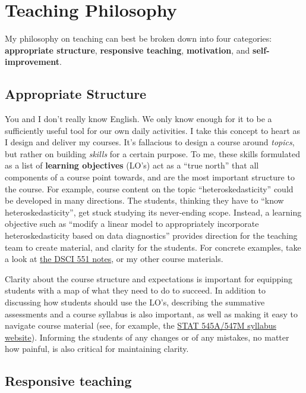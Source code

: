 \documentclass[]{book}
\begin{document}
\hypertarget{teaching-philosophy}{%
\section{Teaching Philosophy}\label{teaching-philosophy}}

My philosophy on teaching can best be broken down into four categories: \textbf{appropriate structure}, \textbf{responsive teaching}, \textbf{motivation}, and \textbf{self-improvement}.

\hypertarget{appropriate-structure}{%
\subsection{Appropriate Structure}\label{appropriate-structure}}

You and I don't really know English. We only know enough for it to be a sufficiently useful tool for our own daily activities. I take this concept to heart as I design and deliver my courses. It's fallacious to design a course around \emph{topics}, but rather on building \emph{skills} for a certain purpose. To me, these skills formulated as a list of \textbf{learning objectives} (LO's) act as a ``true north'' that all components of a course point towards, and are the most important structure to the course. For example, course content on the topic ``heteroskedasticity'' could be developed in many directions. The students, thinking they have to ``know heteroskedasticity'', get stuck studying its never-ending scope. Instead, a learning objective such as ``modify a linear model to appropriately incorporate heteroskedasticity based on data diagnostics'' provides direction for the teaching team to create material, and clarity for the students. For concrete examples, take a look at \href{https://ubc-mds.github.io/DSCI_551_stat-prob-dsci/lectures/}{the DSCI 551 notes}, or my other course materials.

Clarity about the course structure and expectations is important for equipping students with a map of what they need to do to succeed. In addition to discussing how students should use the LO's, describing the summative assessments and a course syllabus is also important, as well as making it easy to navigate course material (see, for example, the \href{https://stat545.stat.ubc.ca/}{STAT 545A/547M syllabus website}). Informing the students of any changes or of any mistakes, no matter how painful, is also critical for maintaining clarity.

\hypertarget{responsive-teaching}{%
\subsection{Responsive teaching}\label{responsive-teaching}}
\end{document}

